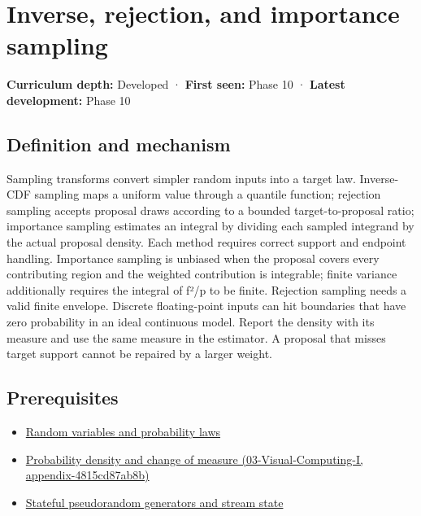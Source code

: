 \hypertarget{appendix-8d863ed954d0}{}
\section{Inverse, rejection, and importance sampling}\label{appendix-8d863ed954d0-inverse-rejection-and-importance-sampling}

\textbf{Curriculum depth:} Developed · \textbf{First seen:} Phase 10 · \textbf{Latest development:} Phase 10

\subsection{Definition and mechanism}\label{appendix-8d863ed954d0-definition-and-mechanism}

Sampling transforms convert simpler random inputs into a target law. Inverse-CDF sampling maps a uniform value through a quantile function; rejection sampling accepts proposal draws according to a bounded target-to-proposal ratio; importance sampling estimates an integral by dividing each sampled integrand by the actual proposal density. Each method requires correct support and endpoint handling. Importance sampling is unbiased when the proposal covers every contributing region and the weighted contribution is integrable; finite variance additionally requires the integral of f²/p to be finite. Rejection sampling needs a valid finite envelope. Discrete floating-point inputs can hit boundaries that have zero probability in an ideal continuous model. Report the density with its measure and use the same measure in the estimator. A proposal that misses target support cannot be repaired by a larger weight.

\subsection{Prerequisites}\label{appendix-8d863ed954d0-prerequisites}

\begin{itemize}
\tightlist
\item
  \hyperref[appendix-4d0203f7944f]{Random variables and probability laws}
\item
  \href{../03-Visual-Computing-I/main.pdf\#nameddest=appendix-4815cd87ab8b}{Probability density and change of measure (03-Visual-Computing-I, appendix-4815cd87ab8b)}
\item
  \hyperref[appendix-e0f7c7e08f3a]{Stateful pseudorandom generators and stream state}
\end{itemize}

